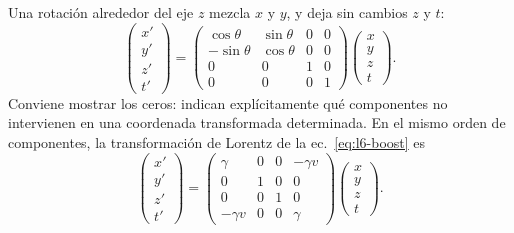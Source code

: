 \begin{classroomqa}\end{classroomqa}

Una rotación alrededor del eje \(z\) mezcla \(x\) y \(y\), y deja sin cambios \(z\) y \(t\): \begin{equation}
\begin{pmatrix}
  x'\\ y'\\ z'\\ t'
\end{pmatrix}
=
\begin{pmatrix}
  \cos\theta & \sin\theta & 0 & 0\\
  -\sin\theta & \cos\theta & 0 & 0\\
  0 & 0 & 1 & 0\\
  0 & 0 & 0 & 1
\end{pmatrix}
\begin{pmatrix}
  x\\ y\\ z\\ t
\end{pmatrix}.
\end{equation} Conviene mostrar los ceros: indican explícitamente qué componentes no intervienen en una coordenada transformada determinada. En el mismo orden de componentes, la transformación de Lorentz de la ec.~\eqref{eq:l6-boost} es \begin{equation}
\begin{pmatrix}
  x'\\ y'\\ z'\\ t'
\end{pmatrix}
=
\begin{pmatrix}
  \gamma & 0 & 0 & -\gamma v\\
  0 & 1 & 0 & 0\\
  0 & 0 & 1 & 0\\
  -\gamma v & 0 & 0 & \gamma
\end{pmatrix}
\begin{pmatrix}
  x\\ y\\ z\\ t
\end{pmatrix}.
\end{equation}

